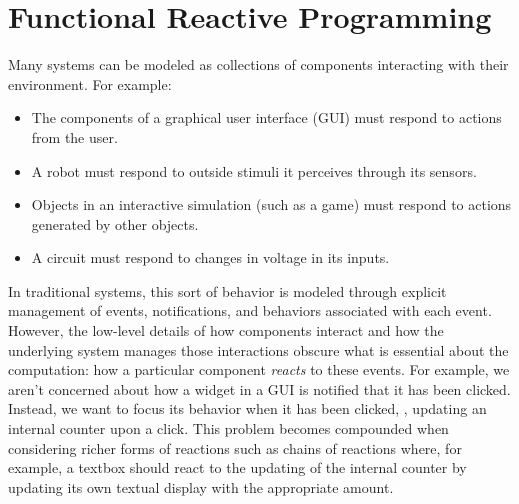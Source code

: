 \section{Functional Reactive Programming}
\label{sec:frp_background}
Many systems can be modeled as collections of components interacting with their environment.
For example:
\begin{itemize}[itemsep=0pt]
  \item The components of a graphical user interface (GUI) must respond to actions from the user.
  \item A robot must respond to outside stimuli it perceives through its sensors.
  \item Objects in an interactive simulation (such as a game) must respond to actions generated by other objects.
  \item A circuit must respond to changes in voltage in its inputs.
\end{itemize}
In traditional systems, this sort of behavior is modeled through explicit management of events, notifications, and behaviors associated with each event.
However, the low-level details of how components interact and how the underlying system manages those interactions obscure what is essential about the computation: how a particular component \emph{reacts} to these events.
For example, we aren't concerned about how a widget in a GUI is notified that it has been clicked.
Instead, we want to focus its behavior when it has been clicked, \eg, updating an internal counter upon a click.
This problem becomes compounded when considering richer forms of reactions such as chains of reactions where, for example, a textbox should react to the updating of the internal counter by updating its own textual display with the appropriate amount.

